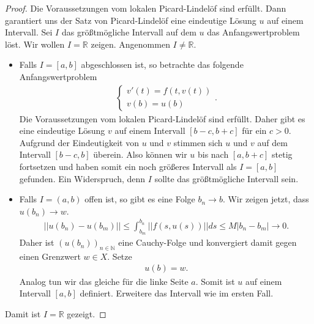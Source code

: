 \documentclass[a4paper]{article}
\theoremstyle{definition}
\begin{document}
\begin{proof}
Die Voraussetzungen vom lokalen Picard-Lindelöf sind erfüllt. Dann garantiert uns der Satz von Picard-Lindelöf eine eindeutige Lösung $u$ auf einem Intervall. Sei $I$ das grö\ss tmögliche Intervall auf dem $u$ das Anfangswertproblem löst. Wir wollen $I = \mathbb{R}$ zeigen. Angenommen $I \neq \mathbb{R}$.

\begin{itemize}
    \item Falls $I = [a,b]$ abgeschlossen ist, so betrachte das folgende Anfangswertproblem
    \begin{align*}
        \begin{cases}
            v'(t) = f(t,v(t)) \\
            v(b) = u(b)
        \end{cases}.
    \end{align*}
    Die Voraussetzungen vom lokalen Picard-Lindelöf sind erfüllt. Daher gibt es eine eindeutige Lösung $v$ auf einem Intervall $[b - c, b+c]$ für ein $c > 0$. Aufgrund der Eindeutigkeit von $u$ und $v$ stimmen sich $u$ und $v$ auf dem Intervall $[b-c, b]$ überein. Also können wir $u$ bis nach $[a, b+c]$ stetig fortsetzen und haben somit ein noch grö\ss eres Intervall als $I=[a,b]$ gefunden. Ein Widerspruch, denn $I$ sollte das grö\ss tmögliche Intervall sein.

    \item Falls $I = (a,b)$ offen ist, so gibt es eine Folge $b_n \to b$. Wir zeigen jetzt, dass $u(b_n) \to w$.
    \begin{align*}
        ||u(b_n) - u(b_m)|| \leq \int^{b_n}_{b_m}||f(s,u(s))||ds \leq M |b_n - b_m| \to 0.
    \end{align*} 
    Daher ist $(u(b_n))_{n \in \mathbb{N}}$ eine Cauchy-Folge und konvergiert damit gegen einen Grenzwert $w \in X$. Setze
    \begin{align*}
        u(b) = w.
    \end{align*}
    Analog tun wir das gleiche für die linke Seite $a$. Somit ist $u$ auf einem Intervall $[a,b]$ definiert. Erweitere das Intervall wie im ersten Fall.
\end{itemize}
Damit ist $I = \mathbb{R}$ gezeigt.
\end{proof}
\end{document}
